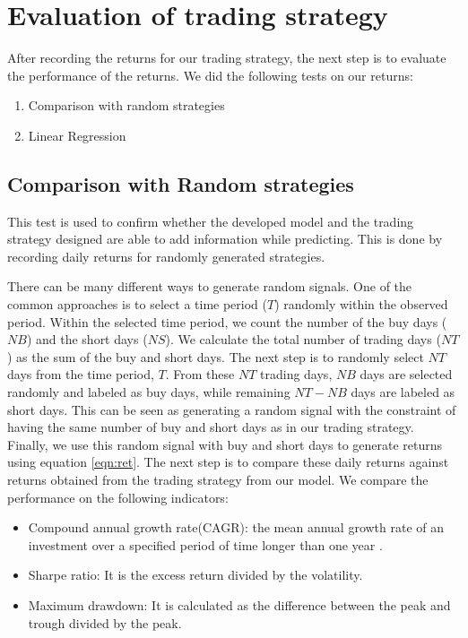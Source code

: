 \section{Evaluation of trading strategy} 
After recording the returns for our trading strategy, the next step is to evaluate the performance of the returns. We did the following tests on our returns:

\begin{enumerate}
\item Comparison with random strategies

\item Linear Regression
\end{enumerate}

\subsection{Comparison with Random strategies} \label{ssec:random}
This test is used to confirm whether the developed model and the trading strategy designed are able to add information while predicting. This is done by recording daily returns for randomly generated strategies. \par

There can be many different ways to generate random signals. One of the common approaches is to select a time period ($T$) randomly within the observed period. Within the selected time period, we count the number of the buy days ($NB$) and the short days ($NS$). We calculate the total number of trading days ($NT$) as the sum of the buy and short days. The next step is to randomly select $NT$ days from the time period, $T$. From these $NT$ trading days, $NB$ days are selected randomly and labeled as buy days, while remaining $NT-NB$ days are labeled as short days. This can be seen as generating a random signal with the constraint of having the same number of buy and short days as in our trading strategy. Finally, we use this random signal with buy and short days to generate returns using equation \ref{eqn:ret}. The next step is to compare these daily returns against returns obtained from the trading strategy from our model. We compare the performance on the following indicators:

\begin{itemize}
\item Compound annual growth rate(CAGR): the mean annual growth rate of an investment over a specified period of time longer than one year \cite{a10}.

\item Sharpe ratio: It is the excess return divided by the volatility.

\item Maximum drawdown: It is calculated as the difference between the peak and trough divided by the peak.

\end{itemize}

